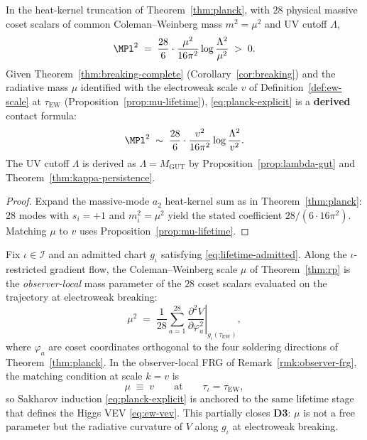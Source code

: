 \begin{proposition}
\label{prop:planck-scale}
In the heat-kernel truncation of Theorem~\ref{thm:planck}, with $28$ physical
massive coset scalars of common Coleman--Weinberg mass $m^2=\mu^2$ and UV
cutoff $\Lambda$,
\begin{equation}\label{eq:planck-explicit}
  \MPl^2
  \;=\;
  \frac{28}{6}\cdot\frac{\mu^2}{16\pi^2}
  \log\frac{\Lambda^2}{\mu^2}
  \;>\;0.
\end{equation}
Given Theorem~\ref{thm:breaking-complete} (Corollary~\ref{cor:breaking}) and
the radiative mass $\mu$ identified with the electroweak scale $v$ of
Definition~\ref{def:ew-scale} at $\tau_{\mathrm{EW}}$
(Proposition~\ref{prop:mu-lifetime}), \eqref{eq:planck-explicit} is a
\textbf{derived} contact formula:
\begin{equation}\label{eq:planck-v}
  \MPl^2
  \;\sim\;
  \frac{28}{6}\cdot\frac{v^2}{16\pi^2}
  \log\frac{\Lambda^2}{v^2}.
\end{equation}
The UV cutoff $\Lambda$ is derived as $\Lambda=M_{\mathrm{GUT}}$ by
Proposition~\ref{prop:lambda-gut} and Theorem~\ref{thm:kappa-persistence}.
\end{proposition}

\begin{proof}
Expand the massive-mode $a_2$ heat-kernel sum as in
Theorem~\ref{thm:planck}: $28$ modes with $s_i=+1$ and $m_i^2=\mu^2$ yield
the stated coefficient $28/(6\cdot16\pi^2)$. Matching $\mu$ to $v$ uses
Proposition~\ref{prop:mu-lifetime}.
\end{proof}

\begin{proposition}
\label{prop:mu-lifetime}
Fix $\iota\in\mathcal{I}$ and an admitted chart $g_\iota$ satisfying
\eqref{eq:lifetime-admitted}. Along the $\iota$-restricted gradient flow,
the Coleman--Weinberg scale $\mu$ of Theorem~\ref{thm:rp} is the
\emph{observer-local} mass parameter of the $28$ coset scalars evaluated on
the trajectory at electroweak breaking:
\begin{equation}\label{eq:mu-tau-ew}
  \mu^2
  \;=\;
  \frac{1}{28}\sum_{a=1}^{28}
  \left.\frac{\partial^2 V}{\partial\varphi_a^2}\right|_{g_\iota(\tau_{\mathrm{EW}})},
\end{equation}
where $\varphi_a$ are coset coordinates orthogonal to the four soldering
directions of Theorem~\ref{thm:planck}. In the observer-local FRG of
Remark~\ref{rmk:observer-frg}, the matching condition at scale $k=v$ is
\begin{equation}\label{eq:mu-match}
  \mu\;\equiv\;v
  \qquad\text{at}\qquad
  \tau_\iota=\tau_{\mathrm{EW}},
\end{equation}
so Sakharov induction \eqref{eq:planck-explicit} is anchored to the same
lifetime stage that defines the Higgs VEV \eqref{eq:ew-vev}. This partially
closes \textbf{D3}: $\mu$ is not a free parameter but the radiative curvature
of $V$ along $g_\iota$ at electroweak breaking.
\end{proposition}

